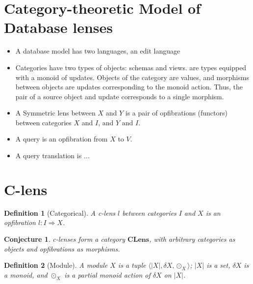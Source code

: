 \documentclass[a4paper,10pt]{article}
\newtheorem{definition}{Definition}
\newtheorem{conj}{Conjecture}
\newcommand{\clens}{\ensuremath{\mathbf{CLens}}}
\begin{document}
\section{Category-theoretic Model of Database lenses}
\begin{itemize}
 \item A database model has two languages, an edit language
 \item Categories have two types of objects: schemas and views. are types equipped with a monoid of updates. Objects of the category are values, and morphisms between objects are updates corresponding to the monoid action. Thus, the pair of a source object and update corresponds to a single morphism. 
 \item A Symmetric lens between $X$ and $Y$ is a pair of opfibrations (functors) between categories $X$ and $I$, and $Y$ and $I$.
 \item A query is an opfibration from $X$ to $V$.
 \item A query translation is $\ldots$
\end{itemize}

\section{C-lens}
\begin{definition}[Categorical]
 A c-lens $l$ between categories $I$ and $X$ is an opfibration $l : I \Rightarrow X$.
\end{definition}

\begin{conj}
 c-lenses form a category \clens, with arbitrary categories as objects and opfibrations as morphisms.
\end{conj}


\begin{definition} [Module]
  A module $X$ is a tuple $\langle |X|, \delta X, \odot_X \rangle$; $|X|$ is a set, $\delta X$ is a monoid, and $\odot_X$ is a partial monoid action of $\delta X$ on $|X|$.
\end{definition}
\end{document}
